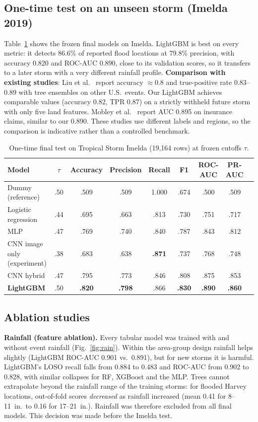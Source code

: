 \documentclass{article}
\begin{document}
\subsection{One-time test on an unseen storm (Imelda 2019)}
Table~\ref{tab:test} shows the frozen final models on Imelda. LightGBM is best on every metric: it detects 86.6\% of reported flood locations at 79.8\% precision, with accuracy 0.820 and ROC-AUC 0.890, close to its validation scores, so it transfers to a later storm with a very different rainfall profile. \textbf{Comparison with existing studies}: Liu et al.\ \cite{liu2024interpretable} report accuracy $\approx$0.8 and true-positive rate 0.83--0.89 with tree ensembles on other U.S.\ events. Our LightGBM achieves comparable values (accuracy 0.82, TPR 0.87) on a strictly withheld future storm with only five land features. Mobley et al.\ \cite{mobley2021texas} report AUC 0.895 on insurance claims, similar to our 0.890. These studies use different labels and regions, so the comparison is indicative rather than a controlled benchmark.

\begin{table}[t]
\centering\small
\caption{One-time final test on Tropical Storm Imelda (19,164 rows) at frozen cutoffs $\tau$.}
\label{tab:test}
\begin{tabular}{lcccccccc}
\toprule
Model & $\tau$ & Accuracy & Precision & Recall & F1 & ROC-AUC & PR-AUC \\
\midrule
Dummy (reference) & .50 & .509 & .509 & 1.000 & .674 & .500 & .509 \\
Logistic regression & .44 & .695 & .663 & .813 & .730 & .751 & .717 \\
MLP & .47 & .769 & .740 & .840 & .787 & .843 & .812 \\
CNN image only (experiment) & .38 & .683 & .638 & \textbf{.871} & .737 & .768 & .748 \\
CNN hybrid & .47 & .795 & .773 & .846 & .808 & .875 & .853 \\
\textbf{LightGBM} & .50 & \textbf{.820} & \textbf{.798} & .866 & \textbf{.830} & \textbf{.890} & \textbf{.860} \\
\bottomrule
\end{tabular}
\end{table}

\subsection{Ablation studies}
\textbf{Rainfall (feature ablation).} Every tabular model was trained with and without event rainfall (Fig.~\ref{fig:rain}). Within the area-group design rainfall helps slightly (LightGBM ROC-AUC 0.901 vs.\ 0.891), but for new storms it is harmful. LightGBM's LOSO recall falls from 0.884 to 0.483 and ROC-AUC from 0.902 to 0.828, with similar collapses for RF, XGBoost and the MLP. Trees cannot extrapolate beyond the rainfall range of the training storms: for flooded Harvey locations, out-of-fold scores \emph{decreased} as rainfall increased (mean 0.41 for 8--11~in.\ to 0.16 for 17--21~in.). Rainfall was therefore excluded from all final models. This decision was made before the Imelda test.
\end{document}
